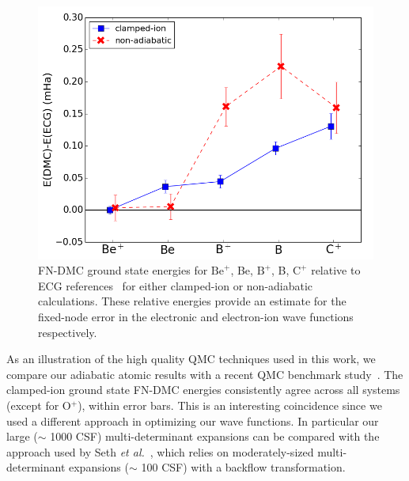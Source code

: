 \documentclass[pra,superscriptaddress,groupedaddress,twocolumn]{revtex4}
\begin{document}
\begin{figure}[t]
\centering
\includegraphics[scale=.4]{Figures/atom-ECG}
\caption{FN-DMC ground state energies for $\text{Be}^+$, Be, $\text{B}^+$, B, $\text{C}^+$ relative to ECG references~\cite{Stanke_Be,Puchalski_Be+,Bubin_BeH_noBO,Bubin_B,Bubin_B+,Bubin_C+} for either clamped-ion or non-adiabatic calculations. These relative energies provide an estimate for the fixed-node error in the electronic and electron-ion wave functions respectively.\label{fig:atom-ECG}}
\end{figure}

As an illustration of the high quality QMC techniques used in this work, we compare our adiabatic atomic results with a recent QMC benchmark study~\cite{Seth_Bench}. The clamped-ion ground state FN-DMC energies consistently agree across all systems (except for O$^{+}$), within error bars. This is an interesting coincidence since we used a different approach in optimizing our wave functions. In particular our large ($\sim$ 1000 CSF) multi-determinant expansions can be compared with the approach used by Seth {\it et al.}~\cite{Seth_Bench}, which relies on moderately-sized multi-determinant expansions ($\sim$ 100 CSF) with a backflow transformation. 
\end{document}
